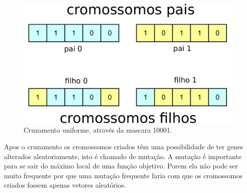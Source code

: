 \documentclass[10pt,a4paper]{article}
\begin{document}
\begin{figure}[H]
  \center
  \includegraphics[scale=0.6]{imgs/diagramaMascara.pdf}            
  \caption{Cruzamento uniforme, através da mascara 10001.}
  \label{fig:MostrandoOCruzamentoUniforme}
\end{figure} 

Apos o cruzamento os cromossomos criados têm uma possibilidade de ter genes alterados aleatoriamente, isto é chamado de mutação. A mutação é importante para se sair do máximo local de uma função objetivo. Porem ela não pode ser muito frequente por que uma mutação frequente faria com que os cromossomos criados fossem apenas vetores aleatórios.
\end{document}

